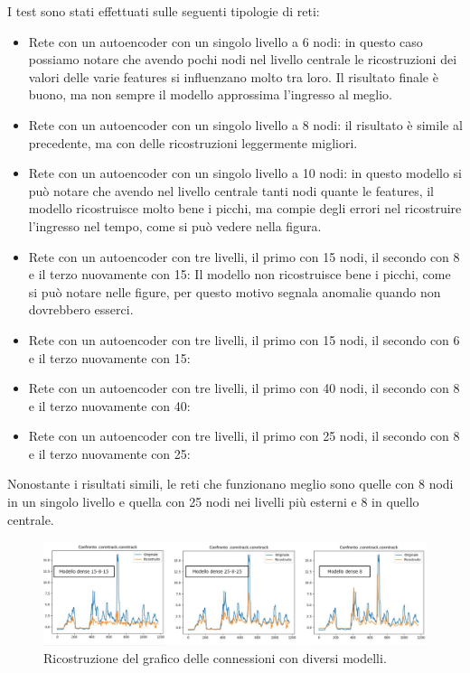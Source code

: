 I test sono stati effettuati sulle seguenti tipologie di reti:
\begin{itemize}
    \item Rete con un autoencoder con un singolo livello a 6 nodi: in questo caso possiamo notare che avendo pochi nodi nel livello centrale le ricostruzioni dei valori delle varie features si influenzano molto tra loro. Il risultato finale è buono, ma non sempre il modello approssima l'ingresso al meglio.
    \item Rete con un autoencoder con un singolo livello a 8 nodi: il risultato è simile al precedente, ma con delle ricostruzioni leggermente migliori.
    \item Rete con un autoencoder con un singolo livello a 10 nodi: in questo modello si può notare che avendo nel livello centrale tanti nodi quante le features, il modello ricostruisce molto bene i picchi, ma compie degli errori nel ricostruire l'ingresso nel tempo, come si può vedere nella figura.
    \item Rete con un autoencoder con tre livelli, il primo con 15 nodi, il secondo con 8 e il terzo nuovamente con 15: Il modello non ricostruisce bene i picchi, come si può notare nelle figure, per questo motivo segnala anomalie quando non dovrebbero esserci.
    \item Rete con un autoencoder con tre livelli, il primo con 15 nodi, il secondo con 6 e il terzo nuovamente con 15: %

    \item Rete con un autoencoder con tre livelli, il primo con 40 nodi, il secondo con 8 e il terzo nuovamente con 40:  %
    \item Rete con un autoencoder con tre livelli, il primo con 25 nodi, il secondo con 8 e il terzo nuovamente con 25:  %

\end{itemize}

Nonostante i risultati simili, le reti che funzionano meglio sono quelle con 8 nodi in un singolo livello e quella con 25 nodi nei livelli più esterni e 8 in quello centrale.

\begin{figure}[]
    \label{fig:reconstructions}
    \includegraphics[width=\hsize]{images/my_work/confronto_modelli.png}
    \caption{Ricostruzione del grafico delle connessioni con diversi modelli.}
    \centering
\end{figure}

